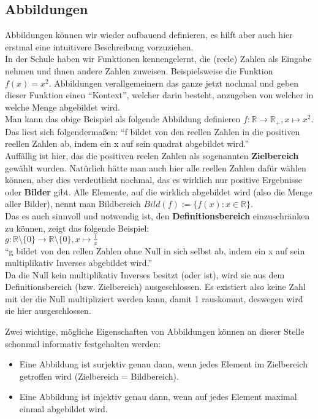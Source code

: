 \documentclass[parskip=full]{scrartcl}
\begin{document}
    \subsection{Abbildungen}
        Abbildungen können wir wieder aufbauend definieren, es hilft aber auch hier erstmal eine intuitivere Beschreibung vorzuziehen.
        \\In der Schule haben wir Funktionen kennengelernt, die (reele) Zahlen als Eingabe nehmen und ihnen andere Zahlen zuweisen.
        Beispielsweise die Funktion \(f(x) = x^2\). Abbildungen verallgemeinern das ganze jetzt nochmal und geben dieser Funktion einen \enquote{Kontext},
        welcher darin besteht, anzugeben von welcher in welche Menge abgebildet wird.
        \\Man kann das obige Beispiel als folgende Abbildung definieren \(f: \mathbb{R} \to \mathbb{R}_+, x \mapsto x^2\). 
        \\Das liest sich folgendermaßen: \enquote{f bildet von den reellen Zahlen in die positiven reellen Zahlen ab, 
        indem ein x auf sein quadrat abgebildet wird.}
        \\Auffällig ist hier, das die positiven reelen Zahlen als sogenannten \textbf{Zielbereich} gewählt wurden.
        Natürlich hätte man auch hier alle reellen Zahlen dafür wählen können, aber dies verdeutlicht nochmal, das es wirklich nur positive Ergebnisse oder \textbf{Bilder} gibt.
        Alle Elemente, auf die wirklich abgebildet wird (also die Menge aller Bilder), nennt man Bildbereich \(Bild(f) := \{f(x) : x \in \mathbb{R}\}\).
        \\Das es auch sinnvoll und notwendig ist, den \textbf{Definitionsbereich} einzuschränken zu können, zeigt das folgende Beispiel: 
        \\\(g: \mathbb{R} \setminus \{0\} \to \mathbb{R} \setminus \{0\}, x \mapsto \frac{1}{x}\)
        \\\enquote{g bildet von den rellen Zahlen ohne Null in sich selbst ab, indem ein x auf sein multiplikativ Inverses abgebildet wird.}
        \\Da die Null kein multiplikativ Inverses besitzt (oder ist), wird sie aus dem Definitionsbereich (bzw. Zielbereich) ausgeschlossen.
        Es existiert also keine Zahl mit der die Null multipliziert werden kann, damit 1 rauskommt, deswegen wird sie hier ausgeschlossen. 
        
        Zwei wichtige, mögliche Eigenschaften von Abbildungen können an dieser Stelle schonmal informativ festgehalten werden:
        \begin{itemize}
            \item Eine Abbildung ist surjektiv genau dann, wenn jedes Element im Zielbereich getroffen wird (Zielbereich = Bildbereich).
            \item Eine Abbildung ist injektiv genau dann, wenn auf jedes Element maximal einmal abgebildet wird. 
        \end{itemize}
\end{document}
